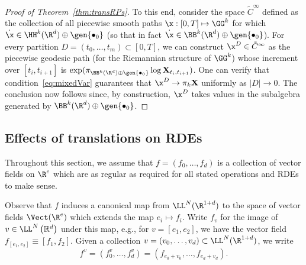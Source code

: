 \documentclass{article}
\begin{document}
\begin{proof}[Proof of Theorem~\ref{thm:transRPs}]
To this end, consider the space $\tilde C^{\infty}$ defined as the collection of all piecewise smooth paths $\x : [0,T] \mapsto \GG^k$ for which $\dot{\x} \in \HH^k(\R^d) \oplus \gen{\bullet_0}$ (so that in fact $\dot{\x} \in \BB^k(\R^d) \oplus \gen{\bullet_0}$). For every partition $D = (t_0,\dots, t_m) \subset [0,T]$, we can construct $\x^D \in \tilde C^\infty$ as the piecewise geodesic path (for the Riemannian structure of $\GG^k$) whose increment over $[t_i,t_{i+1}]$ is $\exp( \pi_{\BB^k(\R^d) \oplus \gen{\bullet_0}} \log\mathbf{X}_{t_i,t_{i+1}})$. One can verify that condition~\eqref{eq:mixedVar} guarantees that $\x^D \rightarrow \pi_k \mathbf{X}$ uniformly as $|D| \rightarrow 0$. The conclusion now follows since, by construction, $\x^D$ takes values in the subalgebra generated by $\BB^k(\R^d) \oplus \gen{\bullet_0}$.
\end{proof}



\subsection{Effects of translations on RDEs}\label{subsec:effectsRDEs}

Throughout this section, we assume that $f=\left( f_0, \dots , f_{d}\right)$ is a collection of vector fields on $\R^e$ which are as regular as required for all stated operations and RDEs to make sense.

Observe that $f$ induces a canonical map from $\LL^N(\R^{1+d})$ to the space of vector fields $\Vect(\R^e)$ which extends the map $e_{i}\mapsto f_{i}$. Write $f_{v}$ for the image of $v\in \LL^{N}\left( \mathbb{R}%
^{d}\right)$ under this map, e.g., for $v = \left[ e_{1},e_{2}\right] $, we have the vector
field $f_{\left[ e_{1},e_{2}\right] } \equiv \left[ f_{1},f_{2}\right] $. Given a collection $v = (v_0,\ldots, v_d) \subset \LL^N(\R^{1+d})$, we write
\[
f^v = (f^v_0,\ldots, f^v_d) = (f_{e_0 + v_0},\ldots, f_{e_d+v_d}).
\]
\end{document}
